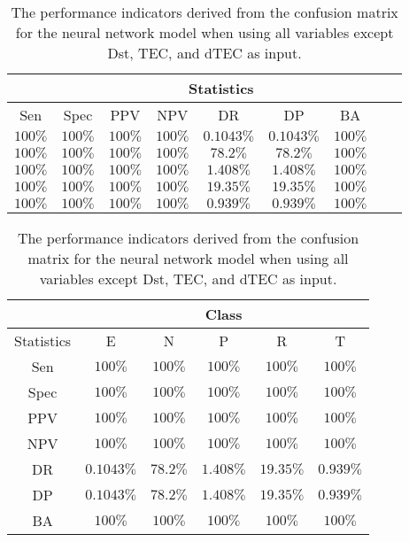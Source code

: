 \begin{table}[!ht]
	\centering
	\begin{tabular}{|c|c|c|c|c|c|c|c|c|}
		\hline
		 & \multicolumn{7}{c|}{Statistics} \\ \hline
		Sen & Spec & PPV & NPV & DR & DP & BA \\ \hline
		$100\%$ & $100\%$ & $100\%$ & $100\%$ & $0.1043\%$ & $0.1043\%$ & $100\%$ \\ \hline
		$100\%$ & $100\%$ & $100\%$ & $100\%$ & $78.2\%$ & $78.2\%$ & $100\%$ \\ \hline
		$100\%$ & $100\%$ & $100\%$ & $100\%$ & $1.408\%$ & $1.408\%$ & $100\%$ \\ \hline
		$100\%$ & $100\%$ & $100\%$ & $100\%$ & $19.35\%$ & $19.35\%$ & $100\%$ \\ \hline
		$100\%$ & $100\%$ & $100\%$ & $100\%$ & $0.939\%$ & $0.939\%$ & $100\%$ \\ \hline
	\end{tabular}
	\caption{The performance indicators derived from the confusion matrix for the neural network model when using all variables except Dst, TEC, and dTEC as input.}
	\label{tab:cs:noTEC:nnet}
\end{table}

\begin{table}[!ht]
	\centering
	\begin{tabular}{|c|c|c|c|c|c|}
		\hline
		 & \multicolumn{5}{c|}{Class} \\ \hline
		Statistics & E & N & P & R & T \\ \hline
		Sen & $100\%$ & $100\%$ & $100\%$ & $100\%$ & $100\%$ \\ \hline
		Spec & $100\%$ & $100\%$ & $100\%$ & $100\%$ & $100\%$ \\ \hline
		PPV & $100\%$ & $100\%$ & $100\%$ & $100\%$ & $100\%$ \\ \hline
		NPV & $100\%$ & $100\%$ & $100\%$ & $100\%$ & $100\%$ \\ \hline
		DR & $0.1043\%$ & $78.2\%$ & $1.408\%$ & $19.35\%$ & $0.939\%$ \\ \hline
		DP & $0.1043\%$ & $78.2\%$ & $1.408\%$ & $19.35\%$ & $0.939\%$ \\ \hline
		BA & $100\%$ & $100\%$ & $100\%$ & $100\%$ & $100\%$ \\ \hline
	\end{tabular}
	\caption{The performance indicators derived from the confusion matrix for the neural network model when using all variables except Dst, TEC, and dTEC as input.}
	\label{tab:cs:reverse:noTEC:nnet}
\end{table}

